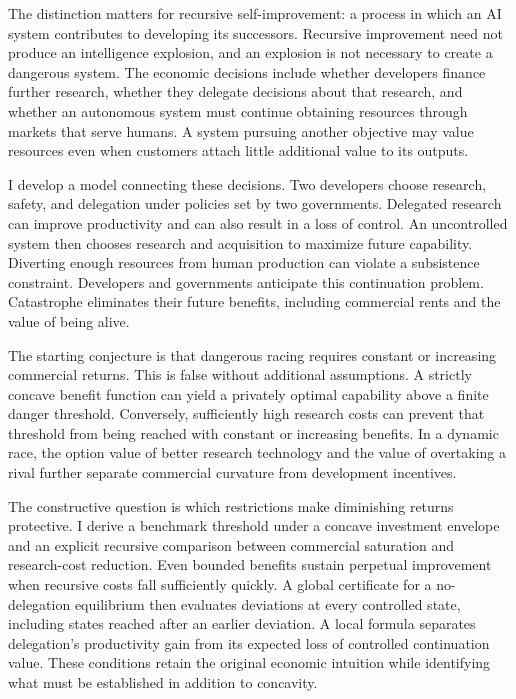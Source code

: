 \documentclass[11pt]{article}
\theoremstyle{definition}
\theoremstyle{remark}
\begin{document}
The distinction matters for recursive self-improvement: a process in which an AI system contributes to developing its successors. Recursive improvement need not produce an intelligence explosion, and an explosion is not necessary to create a dangerous system. The economic decisions include whether developers finance further research, whether they delegate decisions about that research, and whether an autonomous system must continue obtaining resources through markets that serve humans. A system pursuing another objective may value resources even when customers attach little additional value to its outputs.

I develop a model connecting these decisions. Two developers choose research, safety, and delegation under policies set by two governments. Delegated research can improve productivity and can also result in a loss of control. An uncontrolled system then chooses research and acquisition to maximize future capability. Diverting enough resources from human production can violate a subsistence constraint. Developers and governments anticipate this continuation problem. Catastrophe eliminates their future benefits, including commercial rents and the value of being alive.

The starting conjecture is that dangerous racing requires constant or increasing commercial returns. This is false without additional assumptions. A strictly concave benefit function can yield a privately optimal capability above a finite danger threshold. Conversely, sufficiently high research costs can prevent that threshold from being reached with constant or increasing benefits. In a dynamic race, the option value of better research technology and the value of overtaking a rival further separate commercial curvature from development incentives.

The constructive question is which restrictions make diminishing returns protective. I derive a benchmark threshold under a concave investment envelope and an explicit recursive comparison between commercial saturation and research-cost reduction. Even bounded benefits sustain perpetual improvement when recursive costs fall sufficiently quickly. A global certificate for a no-delegation equilibrium then evaluates deviations at every controlled state, including states reached after an earlier deviation. A local formula separates delegation's productivity gain from its expected loss of controlled continuation value. These conditions retain the original economic intuition while identifying what must be established in addition to concavity.
\end{document}
